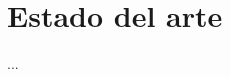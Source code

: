 \documentclass[IB,BIB]{TFUOC}%
\begin{document}


\chapter{Estado del arte}
\label{chap:Introducción}

% 
% 

...
\end{document}
